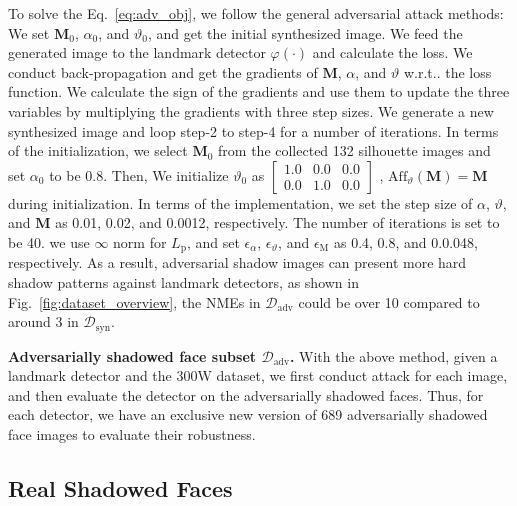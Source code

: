 \documentclass[10pt,twocolumn,letterpaper]{article}
\makeatletter
\newcommand{\figref}[1]{Fig.~\ref{#1}}
\newcommand{\reqref}[1]{Eq.~\eqref{#1}}
\DeclareRobustCommand\onedot{\futurelet\@let@token\@onedot}
\def\@onedot{\ifx\@let@token.\else.\null\fi\xspace}
\def\wrt{w.r.t\onedot} \def\dof{d.o.f\onedot}
\renewcommand{\paragraph}[1]{\vspace{1.25mm}\noindent\textbf{#1}}
\makeatother
\begin{document}
To solve the \reqref{eq:adv_obj}, we follow the general adversarial attack methods:  We set $\mathbf{M}_0$, $\alpha_0$, and $\vartheta_0$, and get the initial synthesized image.  We feed the generated image to the landmark detector  $\varphi(\cdot)$ and calculate the loss.  We conduct back-propagation and get the gradients of $\mathbf{M}$, $\alpha$, and $\vartheta$ \wrt the loss function.  We calculate the sign of the gradients and use them to update the three variables by multiplying the gradients with three step sizes.  We generate a new synthesized image and loop step-2 to step-4 for a number of iterations.
%
In terms of the initialization, we select $\mathbf{M}_0$ from the collected 132 silhouette images and set $\alpha_0$ to be $0.8$. Then, We initialize $\vartheta_0$ as 
%
$\begin{bmatrix}
1.0 & 0.0 & 0.0\\
0.0 & 1.0 & 0.0
\end{bmatrix}$ 
, $\text{Aff}_\vartheta(\mathbf{M})=\mathbf{M}$ during initialization. 
In terms of the implementation, we set the step size of $\alpha$, $\vartheta$, and $\textbf{M}$ as 0.01, 0.02, and 0.0012, respectively. 
The number of iterations is set to be 40. we use $\infty$ norm for $L_\text{p}$, and set $\epsilon_{\alpha}$, $\epsilon_{\vartheta}$, and $\epsilon_\text{M}$ as 0.4, 0.8, and 0.0.048, respectively. As a result, adversarial shadow images can present more hard shadow patterns against landmark detectors, as shown in \figref{fig:dataset_overview}, the NMEs in $\mathcal{D}_\text{adv}$ could be over 10 compared to around 3 in $\mathcal{D}_\text{syn}$.

\paragraph{Adversarially shadowed face subset $\mathcal{D}_\text{adv}$.} With the above method, given a landmark detector and the 300W dataset, we first conduct attack for each image, and then evaluate the detector on the adversarially shadowed faces. Thus, for each detector, we have an exclusive new version of 689 adversarially shadowed face images to evaluate their robustness.


\subsection{Real Shadowed Faces}\label{subsec:real}
\end{document}
